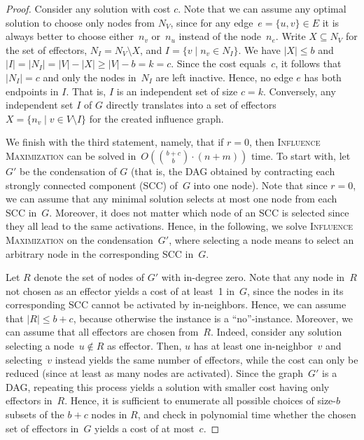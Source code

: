 \documentclass{article}
\begin{document}
\begin{proof}
  Consider any solution with cost $c$. 
  Note that we can assume any optimal solution to choose only nodes from $N_V$, since for any edge~$e=\{u,v\}\in E$ it is always better to choose either~$n_v$ or~$n_u$ instead of the node~$n_e$.
  Write $X\subseteq N_V$ for the set of effectors, $N_I=N_V\setminus X$, and $I=\{v\mid n_v\in N_I\}$.
  We have $|X|\le b$ and $|I|=|N_I|=|V|-|X|\ge |V|-b= k=c$.
  Since the cost equals~$c$, it follows that~$|N_I|=c$ and only the nodes in~$N_I$ are left inactive. Hence, no edge $e$ has both endpoints in $I$. That is, $I$ is an independent set of size $c=k$. 
  Conversely, any independent set $I$ of $G$ directly translates into a set of effectors $X=\{n_v\mid v\in V\setminus I\}$ for the created influence graph.  

  We finish with the third statement, namely, that if $r = 0$,
  then \textsc{Influence Maximization} can be solved in~$O(\binom{b+c}{b} \cdot (n + m))$ time.
  To start with, let~$G'$ be the condensation of $G$ (that is, the DAG obtained by contracting each strongly connected component (SCC) of~$G$ into one node). 
  Note that since $r=0$, we can assume that any minimal solution selects at most one node from each SCC in~$G$. Moreover, it does not matter which node of an SCC is selected since they all lead to the same activations.
  Hence, in the following, we solve \textsc{Influence Maximization} on the condensation~$G'$,
  where selecting a node means to select an arbitrary node in the corresponding SCC in~$G$.
  
  Let $R$ denote the set of nodes of $G'$ with in-degree zero. 
  Note that any node in~$R$ not chosen as an effector yields a cost of at least~1 in~$G$, since the nodes in its corresponding SCC cannot be activated by in-neighbors.
  Hence, we can assume that $|R|\leq b+c$, because otherwise the instance is a ``no''-instance.
  Moreover, we can assume that all effectors are chosen from~$R$. 
  Indeed, consider any solution selecting a node~$u\notin R$ as effector. 
  Then, $u$ has at least one in-neighbor~$v$ and selecting~$v$ instead yields the same number of effectors, while the cost can only be reduced (since at least as many nodes are activated). 
  Since the graph~$G'$ is a DAG, repeating this process yields a solution with smaller cost having only effectors in~$R$.
  Hence, it is sufficient to enumerate all possible choices of
  size-$b$ subsets of the $b+c$ nodes in $R$, 
  and check in polynomial time whether the chosen set of effectors in~$G$
  yields a cost of at most~$c$.  
\end{proof}
\end{document}

